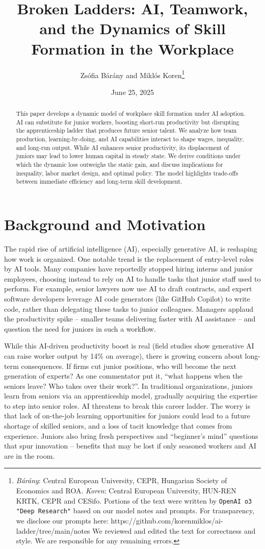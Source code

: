\documentclass[12pt]{article}
\title{Broken Ladders: AI, Teamwork, and the Dynamics of Skill Formation in the Workplace}
\author{Zsófia Bárány and Miklós Koren\thanks{\emph{Bárány}: Central European University, CEPR, Hungarian Society of Economics and ROA. \emph{Koren}: Central European University, HUN-REN KRTK, CEPR and CESifo.  Portions of the text were written by \texttt{OpenAI o3 "Deep Research"} based on our model notes and  prompts. For transparency, we disclose our prompts here: https://github.com/korenmiklos/ai-ladder/tree/main/notes We reviewed and edited the text for correctness and style. We are responsible for any remaining errors.}}
\date{June 25, 2025}
\begin{document}
\maketitle
\begin{abstract}
This paper develops a dynamic model of workplace skill formation under AI adoption. AI can substitute for junior workers, boosting short-run productivity but disrupting the apprenticeship ladder that produces future senior talent. We analyze how team production, learning-by-doing, and AI capabilities interact to shape wages, inequality, and long-run output. While AI enhances senior productivity, its displacement of juniors may lead to lower human capital in steady state. We derive conditions under which the dynamic loss outweighs the static gain, and discuss implications for inequality, labor market design, and optimal policy. The model highlights trade-offs between immediate efficiency and long-term skill development.
\end{abstract}
\section{Background and Motivation}\label{background-and-motivation}

The rapid rise of artificial intelligence (AI), especially generative AI, is reshaping how work is organized. One notable trend is the {replacement of entry-level roles by AI tools}. Many companies have reportedly stopped hiring interns and junior employees, choosing instead to rely on AI to handle tasks that junior staff used to perform. For example, {senior lawyers now use AI to draft contracts}, and {expert software developers leverage AI code generators (like GitHub Copilot) to write code}, rather than delegating these tasks to junior colleagues. Managers applaud the productivity spike -- {smaller teams delivering faster with AI assistance} -- and question the need for juniors in such a workflow. 

While this {AI-driven productivity boost} is real (field studies show generative AI can raise worker output by 14\% on average), there is
growing concern about {long-term consequences}. If firms cut junior positions, {who will become the next generation of experts?}
As one commentator put it, {``what happens when the seniors leave?
Who takes over their work?''}. In traditional organizations, juniors
learn from seniors via an {apprenticeship model}, gradually
acquiring the expertise to step into senior roles. AI threatens to break
this {career ladder}. The worry is that {lack of
on-the-job learning opportunities} for juniors could lead to a future
shortage of skilled seniors, and a loss of tacit knowledge that comes
from experience. Juniors also bring fresh perspectives and ``beginner's
mind'' questions that spur innovation -- benefits that may be lost if
only seasoned workers and AI are in the room.
\end{document}

